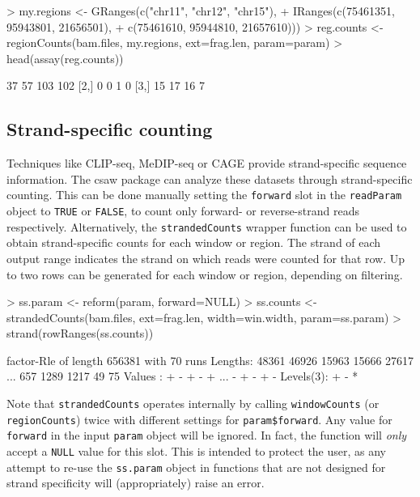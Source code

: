 \documentclass[12pt]{report}
\renewenvironment{Schunk}{\vspace{0pt}}{\vspace{0pt}}
\newcommand{\pkgname}{csaw}
\newcommand{\code}[1]{{\small\texttt{#1}}}
\begin{document}
\begin{Schunk}
\begin{Sinput}
> my.regions <- GRanges(c("chr11", "chr12", "chr15"),
+     IRanges(c(75461351, 95943801, 21656501), 
+     c(75461610, 95944810, 21657610)))
> reg.counts <- regionCounts(bam.files, my.regions, ext=frag.len, param=param)
> head(assay(reg.counts))
\end{Sinput}
\begin{Soutput}
     [,1] [,2] [,3] [,4]
[1,]   37   57  103  102
[2,]    0    0    1    0
[3,]   15   17   16    7
\end{Soutput}
\end{Schunk}

\subsection{Strand-specific counting}
Techniques like CLIP-seq, MeDIP-seq or CAGE provide strand-specific sequence information.
The \pkgname{} package can analyze these datasets through strand-specific counting.
This can be done manually setting the \code{forward} slot in the \code{readParam} object to \code{TRUE} or \code{FALSE}, to count only forward- or reverse-strand reads respectively.
Alternatively, the \code{strandedCounts} wrapper function can be used to obtain strand-specific counts for each window or region.
The strand of each output range indicates the strand on which reads were counted for that row.
Up to two rows can be generated for each window or region, depending on filtering.

\begin{Schunk}
\begin{Sinput}
> ss.param <- reform(param, forward=NULL)
> ss.counts <- strandedCounts(bam.files, ext=frag.len, width=win.width, param=ss.param)
> strand(rowRanges(ss.counts))
\end{Sinput}
\begin{Soutput}
factor-Rle of length 656381 with 70 runs
  Lengths: 48361 46926 15963 15666 27617 ...   657  1289  1217    49    75
  Values :     +     -     +     -     + ...     -     +     -     +     -
Levels(3): + - *
\end{Soutput}
\end{Schunk}

Note that \code{strandedCounts} operates internally by calling \code{windowCounts} (or \code{regionCounts}) twice with different settings for \code{param\$forward}. 
Any value for \code{forward} in the input \code{param} object will be ignored.
In fact, the function will \textit{only} accept a \code{NULL} value for this slot.
This is intended to protect the user, as any attempt to re-use the \code{ss.param} object in functions that are not designed for strand specificity will (appropriately) raise an error.
\end{document}
